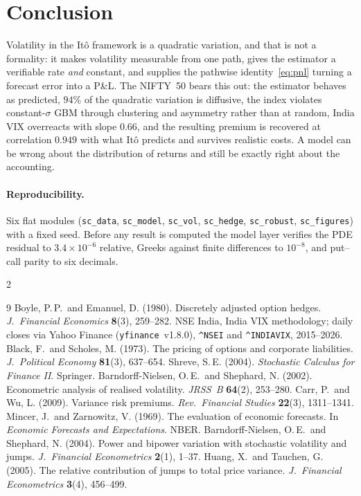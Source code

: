 \documentclass[10pt,a4paper]{article}
\begin{document}
\section{Conclusion}

Volatility in the It\^o framework is a quadratic variation, and that is not a formality: it
makes volatility measurable from one path, gives the estimator a verifiable rate \emph{and}
constant, and supplies the pathwise identity~\eqref{eq:pnl} turning a forecast error into a
P\&L. The NIFTY~50 bears this out: the estimator behaves as predicted, $94\%$ of the
quadratic variation is diffusive, the index violates constant-$\sigma$ GBM through clustering
and asymmetry rather than at random, India VIX overreacts with slope $0.66$, and the resulting
premium is recovered at correlation $0.949$ with what It\^o predicts and survives realistic
costs. A model can be wrong about the distribution of returns and still be exactly right about
the accounting.

\paragraph{Reproducibility.} Six flat modules (\texttt{sc\_data}, \texttt{sc\_model},
\texttt{sc\_vol}, \texttt{sc\_hedge}, \texttt{sc\_robust}, \texttt{sc\_figures}) with a fixed
seed. Before any result is computed the model layer verifies the PDE residual to
$3.4\times10^{-6}$ relative, Greeks against finite differences to $10^{-8}$, and put--call
parity to six decimals.

\vspace{-0.1cm}
\begin{multicols}{2}\scriptsize
\begin{thebibliography}{9}
\scriptsize
\setlength{\itemsep}{-1pt}
 Boyle, P.\,P.\ and Emanuel, D. (1980). Discretely adjusted option hedges.
  \emph{J.\ Financial Economics} \textbf{8}(3), 259--282.
 NSE India, India VIX methodology; daily closes via Yahoo Finance
  (\texttt{yfinance}~v1.8.0), \texttt{\^{}NSEI} and \texttt{\^{}INDIAVIX}, 2015--2026.
 Black, F.\ and Scholes, M. (1973). The pricing of options and corporate
  liabilities. \emph{J.\ Political Economy} \textbf{81}(3), 637--654.
 Shreve, S.\,E. (2004). \emph{Stochastic Calculus for Finance II}. Springer.
 Barndorff-Nielsen, O.\,E.\ and Shephard, N. (2002). Econometric analysis of
  realised volatility. \emph{JRSS\ B} \textbf{64}(2), 253--280.
 Carr, P.\ and Wu, L. (2009). Variance risk premiums. \emph{Rev.\ Financial
  Studies} \textbf{22}(3), 1311--1341.
 Mincer, J.\ and Zarnowitz, V. (1969). The evaluation of economic forecasts.
  In \emph{Economic Forecasts and Expectations}. NBER.
 Barndorff-Nielsen, O.\,E.\ and Shephard, N. (2004). Power and bipower
  variation with stochastic volatility and jumps. \emph{J.\ Financial Econometrics}
  \textbf{2}(1), 1--37.
 Huang, X.\ and Tauchen, G. (2005). The relative contribution of jumps to total
  price variance. \emph{J.\ Financial Econometrics} \textbf{3}(4), 456--499.
\end{thebibliography}
\end{multicols}
\end{document}
